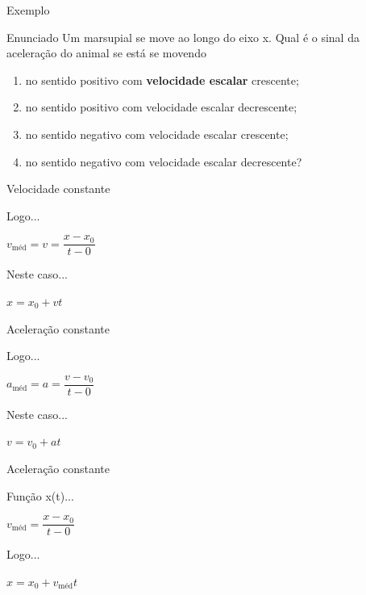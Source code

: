 \documentclass[xcolor=dvipsnames,table]{beamer}
\begin{document}
	\begin{frame}{Exemplo}
		\begin{block}{Enunciado}
			Um marsupial se move ao longo do eixo x. Qual é o sinal da aceleração do animal se está se movendo 
			\begin{enumerate}
				\item no sentido positivo com {\bf velocidade escalar} crescente;
				\item no sentido positivo com velocidade escalar decrescente;
				\item no sentido negativo com velocidade escalar
				crescente;
				\item no sentido negativo com velocidade escalar decrescente?
			\end{enumerate}   
		\end{block}
	\end{frame}
	
	\begin{frame}{Velocidade constante}
		\begin{block}{Logo...}
			\begin{center}
				$v_{\mbox{méd}} = v = \dfrac{x - x_0}{t-0}$
			\end{center}
		\end{block} \pause
		\begin{block}{Neste caso...}
			\begin{center}
				$x = x_0 + vt$
			\end{center}
		\end{block}
	\end{frame}
	
	\begin{frame}{Aceleração constante}
		\begin{block}{Logo...}
			\begin{center}
				$a_{\mbox{méd}} = a = \dfrac{v - v_0}{t-0}$
			\end{center} \pause
		Neste caso...
			\begin{center}
				$v = v_0 + at$
			\end{center}
		\end{block} 
	\end{frame}

	\begin{frame}{Aceleração constante}
		\begin{block}{Função x(t)...}
			\begin{center}
				$v_{\mbox{méd}} = \dfrac{x - x_0}{t-0}$
			\end{center}
			Logo...
			\begin{center}
				$x = x_0 + v_{\mbox{méd}}t$
			\end{center}
		\end{block} 
	\end{frame}
\end{document}
